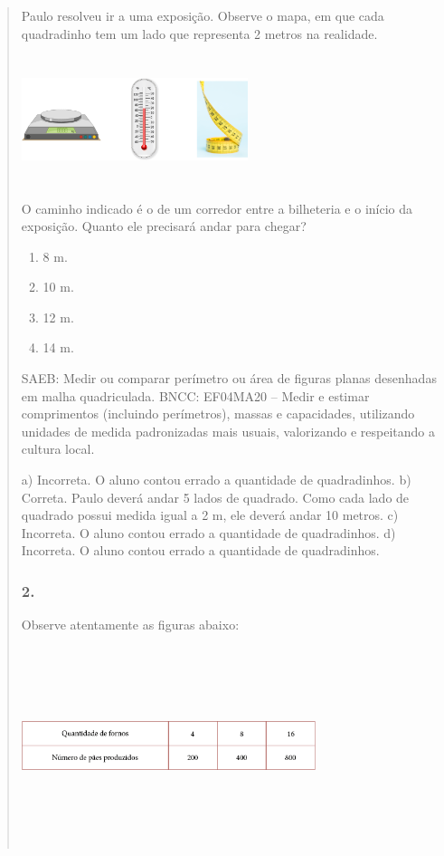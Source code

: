\begin{enumerate}
\begin{escolha}
\begin{enumerate}
\begin{itemize}
\begin{itemize}
\begin{escolha}
\begin{quote}
Paulo resolveu ir a uma exposição. Observe o mapa, em que cada quadradinho tem um lado que representa 2 metros na realidade.

\includegraphics[width=2.60897in,height=1.46587in]{media/image70.png}

O caminho indicado é o de um corredor entre a bilheteria e o início da exposição.
Quanto ele precisará andar para chegar?

\begin{enumerate}
\def\labelenumi{\alph{enumi})}
\item
  8 m.
\item
  10 m.
\item
  12 m.
\item
  14 m.
\end{enumerate}

SAEB: Medir ou comparar perímetro ou área de figuras planas desenhadas em malha quadriculada.
BNCC: EF04MA20 -- Medir e estimar comprimentos (incluindo perímetros), massas e capacidades, utilizando
unidades de medida padronizadas mais usuais, valorizando e respeitando a cultura local.

a) Incorreta. O aluno contou errado a quantidade de quadradinhos.
b) Correta. Paulo deverá andar 5 lados de quadrado. Como cada lado de quadrado possui medida igual a 2 m, ele deverá andar 10 metros.
c) Incorreta. O aluno contou errado a quantidade de quadradinhos.
d) Incorreta. O aluno contou errado a quantidade de quadradinhos.


\subsubsection{2.}\label{section-63}

Observe atentamente as figuras abaixo:

\includegraphics[width=3.39196in,height=2.27520in]{media/image71.png}


\end{quote}
\end{escolha}
\end{itemize}
\end{itemize}
\end{enumerate}
\end{escolha}
\end{enumerate}
